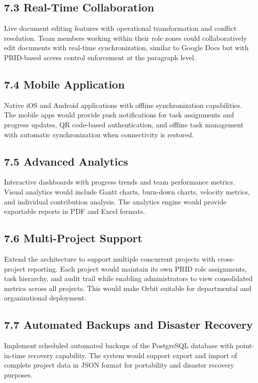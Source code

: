 ﻿\documentclass[12pt]{article}
\begin{document}
\subsection*{7.3 Real-Time Collaboration}
Live document editing features with operational transformation and conflict resolution. Team members working within their role zones could collaboratively edit documents with real-time synchronization, similar to Google Docs but with PRID-based access control enforcement at the paragraph level.

\subsection*{7.4 Mobile Application}
Native iOS and Android applications with offline synchronization capabilities. The mobile apps would provide push notifications for task assignments and progress updates, QR code-based authentication, and offline task management with automatic synchronization when connectivity is restored.

\subsection*{7.5 Advanced Analytics}
Interactive dashboards with progress trends and team performance metrics. Visual analytics would include Gantt charts, burn-down charts, velocity metrics, and individual contribution analysis. The analytics engine would provide exportable reports in PDF and Excel formats.

\subsection*{7.6 Multi-Project Support}
Extend the architecture to support multiple concurrent projects with cross-project reporting. Each project would maintain its own PRID role assignments, task hierarchy, and audit trail while enabling administrators to view consolidated metrics across all projects. This would make Orbit suitable for departmental and organizational deployment.

\subsection*{7.7 Automated Backups and Disaster Recovery}
Implement scheduled automated backups of the PostgreSQL database with point-in-time recovery capability. The system would support export and import of complete project data in JSON format for portability and disaster recovery purposes.
\newpage
\end{document}
